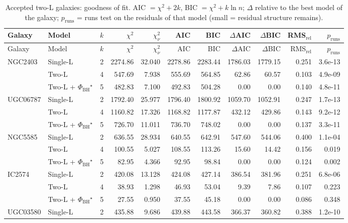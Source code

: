 \documentclass[9pt]{extarticle}
\begin{document}
{\scriptsize\setlength{\tabcolsep}{4pt}
\begin{longtable}{llrrrrrrrrr}
\caption{Accepted two-L galaxies: goodness of fit. AIC $=\chi^2+2k$, BIC $=\chi^2+k\ln n$; $\Delta$ relative to the best model of the galaxy; $p_\mathrm{runs}$ = runs test on the residuals of that model (small = residual structure remains).}\\\toprule
Galaxy & Model & $k$ & $\chi^2$ & $\chi^2_\nu$ & AIC & BIC & $\Delta$AIC & $\Delta$BIC & RMS$_\mathrm{rel}$ & $p_\mathrm{runs}$\\\midrule\endfirsthead
\toprule Galaxy & Model & $k$ & $\chi^2$ & $\chi^2_\nu$ & AIC & BIC & $\Delta$AIC & $\Delta$BIC & RMS$_\mathrm{rel}$ & $p_\mathrm{runs}$\\\midrule\endhead\bottomrule\endfoot
NGC2403 & Single-L & 2 & 2274.86 & 32.040 & 2278.86 & 2283.44 & 1786.03 & 1779.15 & 0.251 & 3.6e-13\\
 & Two-L & 4 & 547.69 & 7.938 & 555.69 & 564.85 & 62.86 & 60.57 & 0.103 & 4.9e-09\\
 & Two-L + $\Phi_\mathrm{BH}$$^\star$ & 5 & 482.83 & 7.100 & 492.83 & 504.28 & 0.00 & 0.00 & 0.140 & 4.8e-11\\
\midrule
UGC06787 & Single-L & 2 & 1792.40 & 25.977 & 1796.40 & 1800.92 & 1059.70 & 1052.91 & 0.247 & 1.7e-13\\
 & Two-L & 4 & 1160.82 & 17.326 & 1168.82 & 1177.87 & 432.12 & 429.86 & 0.143 & 9.2e-12\\
 & Two-L + $\Phi_\mathrm{BH}$$^\star$ & 5 & 726.70 & 11.011 & 736.70 & 748.02 & 0.00 & 0.00 & 0.137 & 3.3e-11\\
\midrule
NGC5585 & Single-L & 2 & 636.55 & 28.934 & 640.55 & 642.91 & 547.60 & 544.06 & 0.400 & 1.1e-04\\
 & Two-L & 4 & 100.55 & 5.027 & 108.55 & 113.26 & 15.60 & 14.42 & 0.156 & 0.019\\
 & Two-L + $\Phi_\mathrm{BH}$$^\star$ & 5 & 82.95 & 4.366 & 92.95 & 98.84 & 0.00 & 0.00 & 0.124 & 0.002\\
\midrule
IC2574 & Single-L & 2 & 420.08 & 13.128 & 424.08 & 427.14 & 386.54 & 381.96 & 0.251 & 6.8e-06\\
 & Two-L & 4 & 38.93 & 1.298 & 46.93 & 53.04 & 9.39 & 7.86 & 0.107 & 0.223\\
 & Two-L + $\Phi_\mathrm{BH}$$^\star$ & 5 & 27.55 & 0.950 & 37.55 & 45.18 & 0.00 & 0.00 & 0.086 & 0.348\\
\midrule
UGC03580 & Single-L & 2 & 435.88 & 9.686 & 439.88 & 443.58 & 366.37 & 360.82 & 0.388 & 1.2e-10\\

\end{longtable}}
\end{document}
